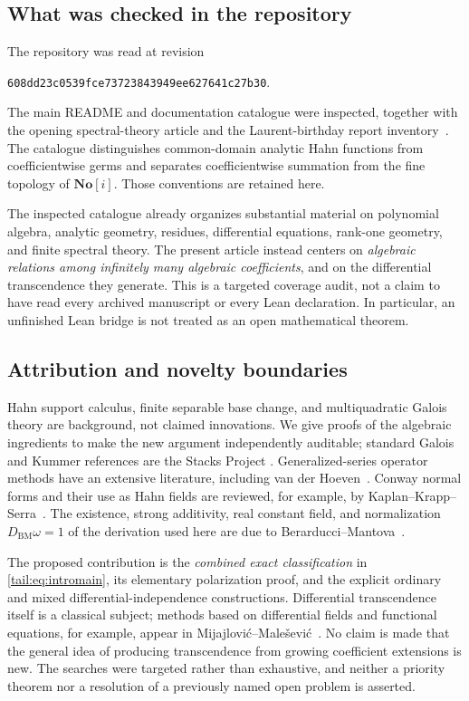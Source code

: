 \documentclass[11pt,a4paper]{article}
\numberwithin{equation}{section}
\theoremstyle{definition}
\theoremstyle{remark}
\newcommand{\No}{\mathbf{No}}
\newcommand{\BM}{D_{\mathrm{BM}}}
\newcommand{\repocommit}{608dd23c0539fce73723843949ee627641c27b30}
\begin{document}
\subsection{What was checked in the repository}
The repository was read at revision
\begin{center}\small\texttt{\repocommit}.\end{center}
The main README and documentation catalogue were inspected, together with
the opening spectral-theory article and the Laurent-birthday report
inventory~\cite{Repo,RepoMap}. The catalogue distinguishes common-domain
analytic Hahn functions from coefficientwise germs and separates
coefficientwise summation from the fine topology of $\No[i]$. Those
conventions are retained here.

The inspected catalogue already organizes substantial material on
polynomial algebra, analytic geometry, residues, differential equations,
rank-one geometry, and finite spectral theory. The present article instead
centers on \emph{algebraic relations among infinitely many algebraic
coefficients}, and on the differential transcendence they generate. This
is a targeted coverage audit, not a claim to have read every archived
manuscript or every Lean declaration. In particular, an unfinished Lean
bridge is not treated as an open mathematical theorem.

\subsection{Attribution and novelty boundaries}
Hahn support calculus, finite separable base change, and multiquadratic
Galois theory are background, not claimed innovations. We give proofs of
the algebraic ingredients to make the new argument independently auditable;
standard Galois and Kummer references are the Stacks Project
\cite{StacksGalois,StacksKummer}. Generalized-series operator methods have
an extensive literature, including van der Hoeven~\cite{vdH}. Conway
normal forms and their use as Hahn fields are reviewed, for example, by
Kaplan--Krapp--Serra~\cite{KKS}. The existence, strong additivity, real
constant field, and normalization $\BM\omega=1$ of the derivation used
here are due to Berarducci--Mantova~\cite{BM}.

The proposed contribution is the \emph{combined exact classification} in
\eqref{tail:eq:intromain}, its elementary polarization proof, and the explicit
ordinary and mixed differential-independence constructions. Differential
transcendence itself is a classical subject; methods based on differential
fields and functional equations, for example, appear in
Mijajlovi\'c--Male\v sevi\'c~\cite{MM}. No claim is made that the general
idea of producing transcendence from growing coefficient extensions is
new. The searches were targeted rather than exhaustive, and neither a
priority theorem nor a resolution of a previously named open problem is
asserted.
\end{document}
